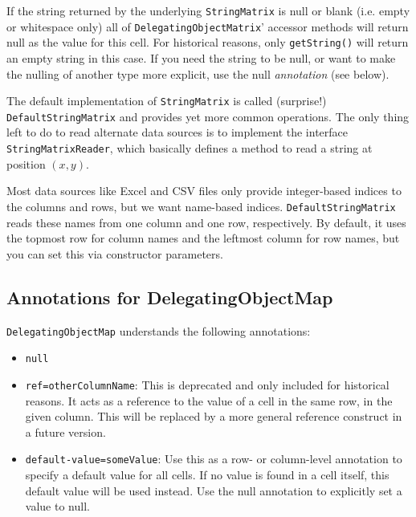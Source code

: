 If the string returned by the underlying \texttt{StringMatrix} is null or blank (i.e. empty or whitespace only) all of \texttt{DelegatingObjectMatrix}' accessor methods will return null as the value for this cell. For historical reasons, only \texttt{getString()} will return an empty string in this case. If you need the string to be null, or want to make the nulling of another type more explicit, use the null \emph{annotation} (see below).

The default implementation of \texttt{StringMatrix} is called (surprise!) \texttt{DefaultStringMatrix} and provides yet more common operations. The only thing left to do to read alternate data sources is to implement the interface \texttt{StringMatrixReader}, which basically defines a method to read a string at position $(x,y)$.

Most data sources like \textsf{Excel} and CSV files only provide integer-based indices to the columns and rows, but we want name-based indices. \texttt{DefaultStringMatrix} reads these names from one column and one row, respectively. By default, it uses the topmost row for column names and the leftmost column for row names, but you can set this via constructor parameters.


\subsection{Annotations for DelegatingObjectMap} %
\label{sub:annotations_for_delegatingobjectmap}

\texttt{DelegatingObjectMap} understands the following annotations:


\begin{itemize}

	\item \texttt{null}  
	
	\item \texttt{ref=otherColumnName}:  This is deprecated and only included for historical reasons. It acts as a reference to the value of a cell in the same row, in the given column. This will be replaced by a more general reference construct in a future version.
	
	\item \texttt{default-value=someValue}: Use this as a row- or column-level annotation to specify a default value for all cells. If no value is found in a cell itself, this default value will be used instead. Use the null annotation to explicitly set a value to null.
\end{itemize}


